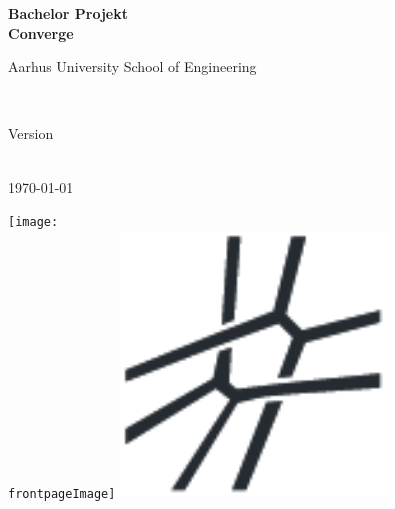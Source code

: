 \begin{center}
	{\fontsize{36pt}{0}\selectfont
		\textbf{
		Bachelor Projekt\\
		}
	}
	\vspace{20pt}
	{\fontsize{28pt}{0}\selectfont
		\textbf{
		Converge\\
		}
	}
	\vspace{20pt}

	{\fontsize{14pt}{0}\selectfont
		Aarhus University School of Engineering\\
	}
	\vspace{20pt}

	{\fontsize{24pt}{0}\selectfont
		\thetitle\\
	}
	\vspace{20pt}

	{\fontsize{18pt}{0}\selectfont
		Version \vhCurrentVersion\\
	}
	\vspace{20pt}

	{\fontsize{18pt}{0}\selectfont
		\ifdefined\frontpageDate
			\frontpageDate\\
		\else
			\today\\
		\fi
	}
	\vspace*{\fill}

	\ifdefined\frontpageImage
		\texttt{[image: \\frontpageImage]}
	\else
		\includegraphics[width=0.85\linewidth,height=200pt,keepaspectratio]{ForsideLogo-sort.pdf}
	\fi
	\vspace*{\fill}


\end{center}
